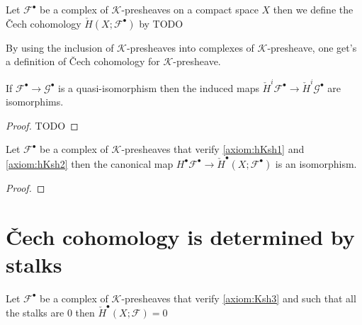 
\section{}

\begin{definition}\label{def:chech_of_compelx_of_k_prsh}
    Let $\mathcal{F}^{\bullet}$ be a complex of $\mathcal{K}$-presheaves on a compact space $X$ then we define the \v{C}ech cohomology $\check{H}(X;\mathcal{F}^{\bullet})$ by TODO
\end{definition}

\begin{remark}\label{def:chech_of_k_prsh}
    By using the inclusion of $\mathcal{K}$-presheaves into complexes of $\mathcal{K}$-presheave, one get's a definition of \v{C}ech cohomology for $\mathcal{K}$-presheave.
\end{remark}

\begin{lemma}\label{lem:chech_preserve_quasi_iso}
    If $\mathcal{F}^{\bullet}\to\mathcal{G}^{\bullet}$ is a quasi-isomorphism then the induced maps $\check{H}^i\mathcal{F}^{\bullet}\to \check{H}^i\mathcal{G}^{\bullet}$ are isomorphims.
\end{lemma}

\begin{proof}
    TODO
\end{proof}

\begin{proposition}\label{prop:homotopy_k_sheaf_compute_chech}
    Let $\mathcal{F}^{\bullet}$ be a complex of $\mathcal{K}$-presheaves that verify \eqref{axiom:hKsh1} and \eqref{axiom:hKsh2} then the canonical map $H^{\bullet}\mathcal{F}^{\bullet}\to \check{H}^{\bullet}(X;\mathcal{F}^{\bullet})$ is an isomorphism.
\end{proposition}

\begin{proof}

\end{proof}

\section{\v{C}ech cohomology is determined by stalks}

\begin{lemma}\label{lem:chech_is_determined_by_stalks_1,K_stalk}
    Let $\mathcal{F}^{\bullet}$ be a complex of $\mathcal{K}$-presheaves that verify \eqref{axiom:Ksh3} and such that all the stalks are $0$ then $\check{H}^{\bullet}(X;\mathcal{F})=0$
    
\end{lemma}

